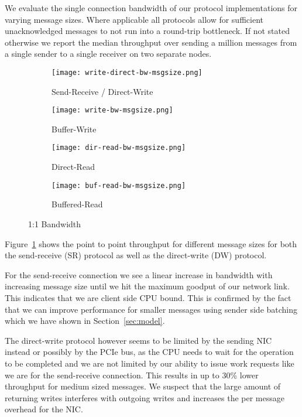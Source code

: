 We evaluate the single connection bandwidth of our protocol implementations for varying message sizes. Where applicable all 
protocols allow for sufficient unacknowledged messages to not run into a round-trip bottleneck. If not 
stated otherwise we report the median throughput over sending a million messages from a single sender to a single receiver
on two separate nodes.

\begin{figure}[htp]
\begin{subfigure}[b]{0.49\textwidth}
  \centering
  \texttt{[image: write-direct-bw-msgsize.png]}
  \caption{Send-Receive / Direct-Write}
  \label{fig:plot-sr-dw-bw}
\end{subfigure}
\begin{subfigure}[b]{0.49\textwidth}
  \centering
  \texttt{[image: write-bw-msgsize.png]}
  \caption{Buffer-Write}
  \label{fig:plot-bw-bw}
\end{subfigure}
\begin{subfigure}[b]{0.49\textwidth}
  \centering
  \texttt{[image: dir-read-bw-msgsize.png]}
  \caption{Direct-Read}
  \label{fig:plot-dr-bw}
\end{subfigure}
\begin{subfigure}[b]{0.49\textwidth}
  \centering
  \texttt{[image: buf-read-bw-msgsize.png]}
  \caption{Buffered-Read}
  \label{fig:plot-br-bw}
\end{subfigure}
  \caption{1:1 Bandwidth}
  \label{fig:plot-bw}
\end{figure}

Figure~\ref{fig:plot-sr-dw-bw} shows the point to point throughput for different message sizes for both the send-receive (SR)
protocol as well as the direct-write (DW) protocol. 

For the send-receive connection we see a linear increase in bandwidth with increasing message size until we hit the
maximum goodput of our network link. This indicates that we are client side CPU bound. This is confirmed by the fact that we can
improve performance for smaller messages using sender side batching which we have shown in Section~\ref{sec:model}.

The direct-write protocol however seems to be limited by the sending NIC instead or possibly by the PCIe bus, as the CPU needs
to wait for the operation to be completed and we are not limited by our ability to issue work requests like we are for the 
send-receive connection. This results in up to 30\% lower throughput for medium sized messages. We suspect that the large 
amount of returning writes interferes with outgoing writes and increases the per message overhead for the NIC. 
 


